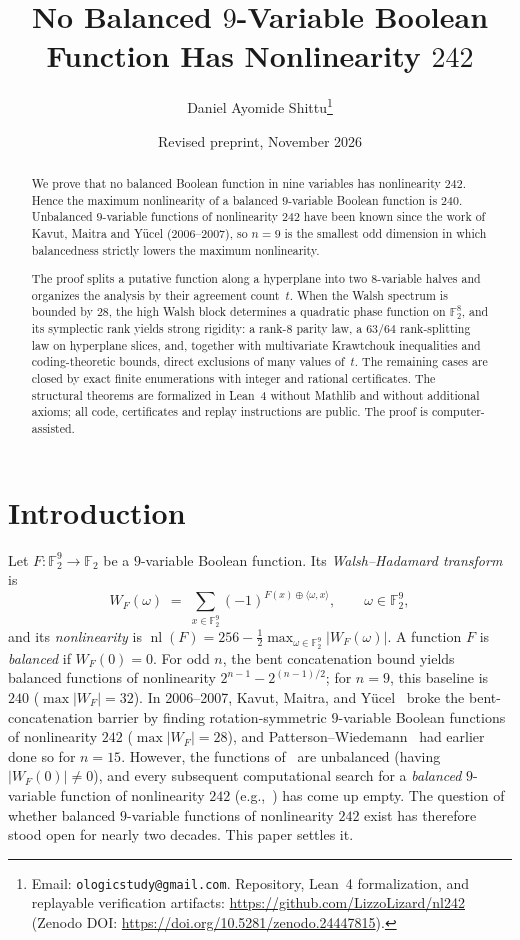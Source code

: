 \documentclass[11pt]{article}
\title{No Balanced $9$-Variable Boolean Function Has Nonlinearity $242$}
\author{Daniel Ayomide Shittu\thanks{Email: \texttt{ologicstudy@gmail.com}. Repository, Lean~4 formalization, and replayable verification artifacts: \url{https://github.com/LizzoLizard/nl242} (Zenodo DOI: \url{https://doi.org/10.5281/zenodo.24447815}).}}
\date{Revised preprint, November 2026}
\theoremstyle{definition}
\newcommand{\F}{\mathbb{F}}
\newcommand{\nl}{\operatorname{nl}}
\begin{document}
\maketitle

\begin{abstract}
We prove that no balanced Boolean function in nine variables has nonlinearity $242$.
Hence the maximum nonlinearity of a balanced $9$-variable Boolean function is $240$.
Unbalanced $9$-variable functions of nonlinearity $242$ have been known since the work of Kavut, Maitra and Y\"ucel (2006--2007), so $n=9$ is the smallest odd dimension in which balancedness strictly lowers the maximum nonlinearity.

The proof splits a putative function along a hyperplane into two $8$-variable halves and organizes the analysis by their agreement count~$t$.
When the Walsh spectrum is bounded by $28$, the high Walsh block determines a quadratic phase function on $\F_2^8$, and its symplectic rank yields strong rigidity: a rank-$8$ parity law, a $63/64$ rank-splitting law on hyperplane slices, and, together with multivariate Krawtchouk inequalities and coding-theoretic bounds, direct exclusions of many values of~$t$.
The remaining cases are closed by exact finite enumerations with integer and rational certificates.
The structural theorems are formalized in Lean~4 without Mathlib and without additional axioms; all code, certificates and replay instructions are public.
The proof is computer-assisted.
\end{abstract}

\tableofcontents

\section{Introduction}
\label{sec:intro}

Let $F : \F_2^9 \to \F_2$ be a $9$-variable Boolean function. Its \emph{Walsh--Hadamard transform} is
\[
  W_F(\omega) \;=\; \sum_{x \in \F_2^9} (-1)^{F(x) \oplus \langle \omega, x \rangle}, \qquad \omega \in \F_2^9,
\]
and its \emph{nonlinearity} is $\nl(F) = 256 - \frac{1}{2}\max_{\omega \in \F_2^9} |W_F(\omega)|$.
A function $F$ is \emph{balanced} if $W_F(0) = 0$.
For odd $n$, the bent concatenation bound yields balanced functions of nonlinearity $2^{n-1} - 2^{(n-1)/2}$; for $n = 9$, this baseline is $240$ ($\max |W_F| = 32$).
In 2006--2007, Kavut, Maitra, and Y\"ucel~\cite{KMY2006,KMY2007} broke the bent-concatenation barrier by finding rotation-symmetric $9$-variable Boolean functions of nonlinearity $242$ ($\max |W_F| = 28$), and Patterson--Wiedemann~\cite{PW1983} had earlier done so for $n = 15$.
However, the functions of~\cite{KMY2007} are unbalanced (having $|W_F(0)| \neq 0$), and every subsequent computational search for a \emph{balanced} $9$-variable function of nonlinearity $242$ (e.g.,~\cite{KY2010,Carlet2021}) has come up empty.
The question of whether balanced $9$-variable functions of nonlinearity $242$ exist has therefore stood open for nearly two decades.
This paper settles it.
\end{document}

